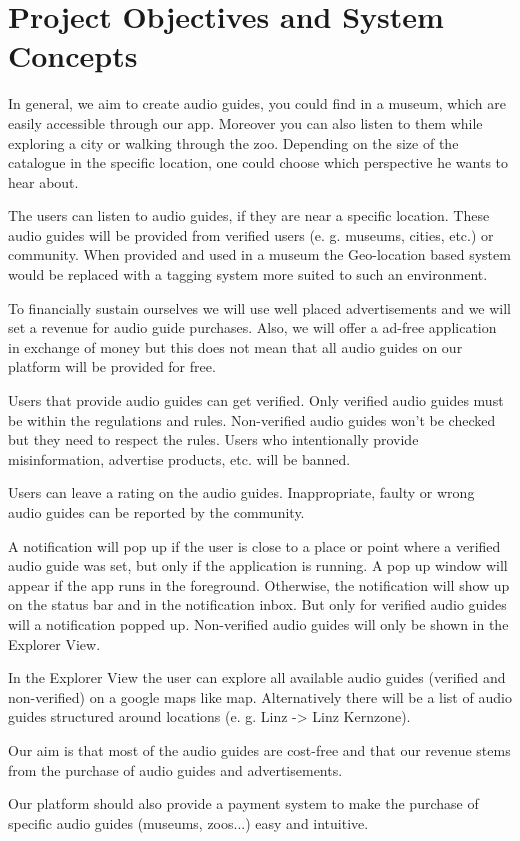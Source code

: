 \documentclass[12pt]{article}
\theoremstyle{definition}
\newenvironment{text}{
}{}
\begin{document}
\pagebreak
 
\section{Project Objectives and System Concepts}
 
\begin{text}
In general, we aim to create audio guides, you could find in a museum, which are easily accessible through our app. Moreover you can also listen to them while exploring a city or walking through the zoo.
Depending on the size of the catalogue in the specific location, one could choose which perspective he wants to hear about.\newline
 
The users can listen to audio guides, if they are near a specific location. These audio guides will be provided from verified users (e. g. museums, cities, etc.) or community. 
When provided and used in a museum the Geo-location based system would be replaced with a tagging system more suited to such an environment.\newline

To financially sustain ourselves we will use well placed advertisements and we will set a revenue for audio guide purchases. Also, we will offer a ad-free application in exchange of money but this does not mean that all audio guides on our platform will be provided for free.
 
Users that provide audio guides can get verified. Only verified audio guides must be within the regulations and rules. Non-verified audio guides won’t be checked but they need to respect the rules. Users who intentionally provide misinformation, advertise products, etc. will be banned.\newline
 
Users can leave a rating on the audio guides. Inappropriate, faulty or wrong audio guides can be reported by the community.\newline
 
A notification will pop up if the user is close to a place or point where a verified audio guide was set, but only if the application is running. A pop up window will appear if the app runs in the foreground. Otherwise, the notification will show up on the status bar and in the notification inbox. But only for verified audio guides will a notification popped up. Non-verified audio guides will only be shown in the Explorer View.\newline
 
In the Explorer View the user can explore all available audio guides (verified and non-verified) on a google maps like map. Alternatively there will be a list of audio guides structured around locations (e. g. Linz -> Linz Kernzone).\newline
 
Our aim is that most of the audio guides are cost-free and that our revenue stems from the purchase of audio guides and advertisements.\newline

Our platform should also provide a payment system to make the purchase of specific audio guides (museums, zoos...) easy and intuitive. 
\end{text}
 
\end{document}
